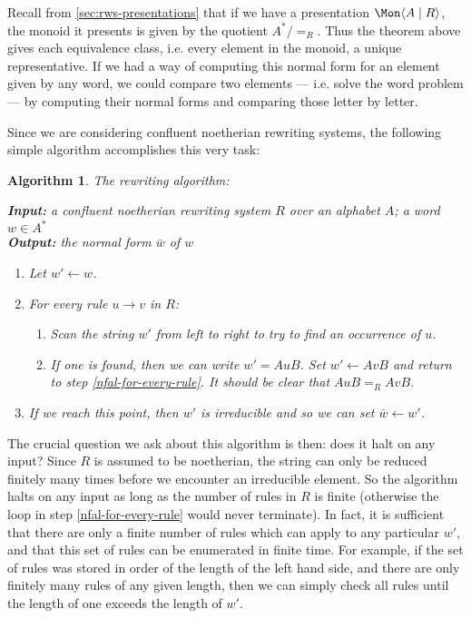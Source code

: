 \documentclass[noindex,noinsetproof,emphthm,12pt]{lmaths}
\newtheorem{algorithm}[defn]{Algorithm}
\begin{document}
Recall from \cref{sec:rws-presentations} that if we have a presentation $\Mon \langle A \mid R \rangle$, the monoid it presents is given by the quotient $A^*/{=_R}$. Thus the theorem above gives each equivalence class, i.e. every element in the monoid, a unique representative. If we had a way of computing this normal form for an element given by any word, we could compare two elements --- i.e. solve the word problem --- by computing their normal forms and comparing those letter by letter.

Since we are considering confluent noetherian rewriting systems, the following simple algorithm accomplishes this very task:

\begin{algorithm} The rewriting algorithm: \label{alg:rewrite}

\hspace{0.05\textwidth}
\parbox[t]{0.9\textwidth}{
	\textbf{Input:} a confluent noetherian rewriting system $R$ over an alphabet $A$; a word $w \in A^*$ \\
	\textbf{Output:} the normal form $\bar w$ of $w$
	\medskip

	\begin{enumerate}
		\item Let $w' \leftarrow w$.
		\item For every rule $u \to v$ in $R$:	\label{nfal-for-every-rule}
			\begin{enumerate}
				\item Scan the string $w'$ from left to right to try to find an occurrence of $u$.
				\item If one is found, then we can write $w' = AuB$. Set $w' \leftarrow AvB$ and return to step \ref{nfal-for-every-rule}. It should be clear that $AuB =_R AvB$.
			\end{enumerate}
		\item If we reach this point, then $w'$ is irreducible and so we can set $\bar w \leftarrow w'$.
	\end{enumerate}
}
\end{algorithm}

The crucial question we ask about this algorithm is then: does it halt on any input? Since $R$ is assumed to be noetherian, the string can only be reduced finitely many times before we encounter an irreducible element. So the algorithm halts on any input as long as the number of rules in $R$ is finite (otherwise the loop in step \ref{nfal-for-every-rule} would never terminate). In fact, it is sufficient that there are only a finite number of rules which can apply to any particular $w'$, and that this set of rules can be enumerated in finite time. For example, if the set of rules was stored in order of the length of the left hand side, and there are only finitely many rules of any given length, then we can simply check all rules until the length of one exceeds the length of $w'$.
\end{document}

